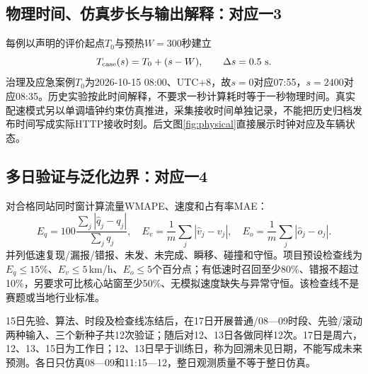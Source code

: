 \documentclass[UTF8,fontset=windows,zihao=-4,a4paper]{ctexart}
\begin{document}
\subsection{物理时间、仿真步长与输出解释：对应一3}
每例以声明的评价起点$T_0$与预热$W=300$秒建立
\begin{equation}
T_{\rm case}(s)=T_0+(s-W),\qquad \Delta s=0.5\ {\rm s}.
\label{eq:clock}
\end{equation}
治理及应急案例$T_0$为2026-10-15 08:00、UTC+8，故$s=0$对应07:55，$s=2400$对应08:35。历史实验按此时间解释，不要求一秒计算耗时等于一秒物理时间。真实配速模式另以单调墙钟约束仿真推进，采集接收时间单独记录，不能把历史归档发布时间写成实际HTTP接收时刻。后文图\ref{fig:physical}直接展示时钟对应及车辆状态。

\subsection{多日验证与泛化边界：对应一4}
对合格同站同时窗计算流量WMAPE、速度和占有率MAE：
\begin{equation}
E_q=100\frac{\sum_j|\widehat q_j-q_j|}{\sum_jq_j},\quad
E_v=\frac1m\sum_j|\widehat v_j-v_j|,\quad
E_o=\frac1m\sum_j|\widehat o_j-o_j|.
\label{eq:errors}\end{equation}
并列低速复现/漏报/错报、未发、未完成、瞬移、碰撞和守恒。项目预设检查线为$E_q\le15\%$、$E_v\le5$\,km/h、$E_o\le5$个百分点；有低速时召回至少80\%、错报不超过10\%，另要求可比核心站窗至少50\%、无模拟速度缺失与异常守恒。该检查线不是赛题或当地行业标准。


15日先验、算法、时段及检查线冻结后，在17日开展普通/08—09时段、先验/滚动两种输入、三个新种子共12次验证；随后对12、13日各做同样12次。17日是周六，12、13、15日为工作日；12、13日早于训练日，称为回溯未见日期，不能写成未来预测。各日只仿真08—09和11:15—12，整日观测质量不等于整日仿真。
\end{document}
